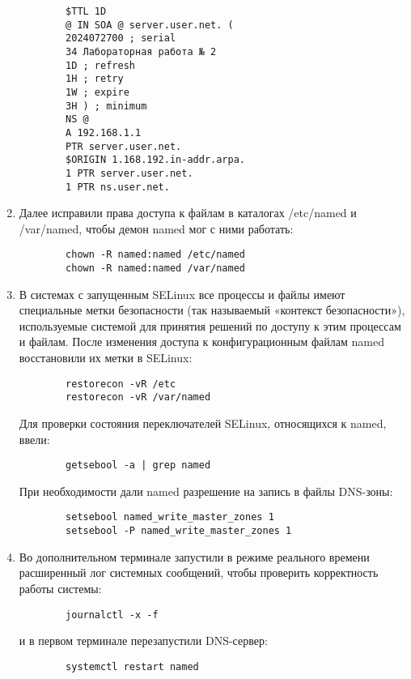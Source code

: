 \begin{enumerate}
        \begin{verbatim}
        $TTL 1D
        @ IN SOA @ server.user.net. (
        2024072700 ; serial
        34 Лабораторная работа № 2
        1D ; refresh
        1H ; retry
        1W ; expire
        3H ) ; minimum
        NS @
        A 192.168.1.1
        PTR server.user.net.
        $ORIGIN 1.168.192.in-addr.arpa.
        1 PTR server.user.net.
        1 PTR ns.user.net.
        \end{verbatim}
    \item Далее исправили права доступа к файлам в каталогах /etc/named и /var/named, чтобы демон named мог с ними работать:
        \begin{verbatim}
        chown -R named:named /etc/named
        chown -R named:named /var/named
        \end{verbatim}
    \item В системах с запущенным SELinux все процессы и файлы имеют специальные метки безопасности (так называемый «контекст безопасности»), используемые системой для принятия решений по доступу к этим процессам и файлам. После изменения доступа к конфигурационным файлам named восстановили их метки в SELinux:
        \begin{verbatim}
        restorecon -vR /etc
        restorecon -vR /var/named
        \end{verbatim}
    Для проверки состояния переключателей SELinux, относящихся к named, ввели:
        \begin{verbatim}
        getsebool -a | grep named
        \end{verbatim}
    При необходимости дали named разрешение на запись в файлы DNS-зоны:
        \begin{verbatim}
        setsebool named_write_master_zones 1
        setsebool -P named_write_master_zones 1
        \end{verbatim}
    \item Во дополнительном терминале запустили в режиме реального времени расширенный лог системных сообщений, чтобы проверить корректность работы системы:
        \begin{verbatim}
        journalctl -x -f
        \end{verbatim}
    и в первом терминале перезапустили DNS-сервер:
        \begin{verbatim}
        systemctl restart named
        \end{verbatim}
\end{enumerate}

